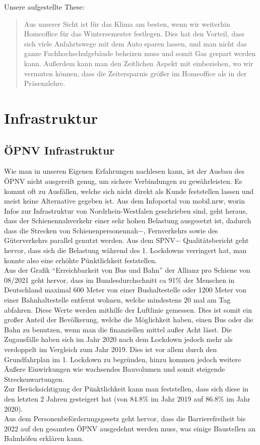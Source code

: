 \documentclass[a4paper,12pt]{scrartcl}
\begin{document}
Unsere aufgestellte These:\\
\blockquote{Aus unserer Sicht ist für das Klima am besten, wenn wir weiterhin Homeoffice für das Wintersemester festlegen. Dies hat den Vorteil, dass sich viele Anfahrtswege mit dem Auto sparen lassen, und man nicht das ganze Fachhochschulgebäude beheizen muss und somit Gas gespart werden kann. Außerdem kann man den Zeitlichen Aspekt mit einbeziehen, wo wir vermuten können, dass die Zeitersparnis größer im Homeoffice als in der Präsenzlehre.}

\section{Infrastruktur}
\subsection{ÖPNV Infrastruktur}
Wie man in unseren Eigenen Erfahrungen nachlesen kann, ist der Ausbau des ÖPNV nicht ausgereift genug, um sichere Verbindungen zu gewährleisten. Es kommt oft zu Ausfällen, welche sich nicht direkt als Kunde feststellen lassen und meist keine Alternative gegeben ist. Aus dem Infoportal von mobil.nrw, worin Infos zur Infrastruktur von Nordrhein-Westfalen geschrieben sind, geht heraus, dass der Schienennahverkehr einer sehr hohen Belastung ausgesetzt ist, dadurch dass die Strecken von Schienenpersonennah$-$, Fernverkehrs sowie des Güterverkehrs parallel genutzt werden. Aus dem SPNV$-$ Qualitätsbericht geht hervor, dass sich die Belastung während des 1. Lockdowns verringert hat, man konnte also eine erhöhte Pünktlichkeit feststellen. \\
Aus der Grafik ``Erreichbarkeit von Bus und Bahn'' der Allianz pro Schiene von 08/2021 geht hervor, dass im Bundesdurchschnitt ca 91\% der Menschen in Deutschland maximal 600 Meter von einer Bushaltestelle oder 1200 Meter von einer Bahnhaltestelle entfernt wohnen, welche mindestens 20 mal am Tag abfahren. Diese Werte werden mithilfe der Luftlinie gemessen. Dies ist somit ein großer Anteil der Bevölkerung, welche die Möglichkeit haben, einen Bus oder die Bahn zu benutzen, wenn man die finanziellen mittel außer Acht lässt. Die Zugausfälle haben sich im Jahr 2020 nach dem Lockdown jedoch mehr als verdoppelt im Vergleich zum Jahr 2019. Dies ist vor allem durch den Grundfahrplan im 1. Lockdown zu begründen, hinzu kommen jedoch weitere Äußere Einwirkungen wie wachsendes Bauvolumen und somit steigende Streckenwartungen.\\
Zur Berücksichtigung der Pünktlichkeit kann man feststellen, dass sich diese in den letzten 2 Jahren gesteigert hat (von 84.8\% im Jahr 2019 auf 86.8\% im Jahr 2020).\\
Aus dem Personenbeförderungsgesetz geht hervor, dass die Barrierefreiheit bis 2022 auf den gesamten ÖPNV ausgedehnt werden muss, was einige Baustellen an Bahnhöfen erklären kann.
\end{document}
